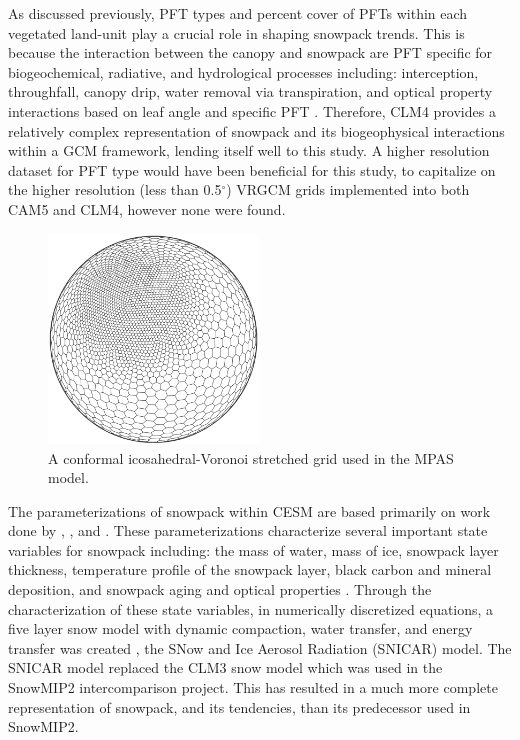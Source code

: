 \documentclass[11pt]{article}
\begin{document}
As discussed previously, PFT types and percent cover of PFTs within each vegetated land-unit play a crucial role in shaping snowpack trends. This is because the interaction between the canopy and snowpack are PFT specific for biogeochemical, radiative, and hydrological processes including: interception, throughfall, canopy drip, water removal via transpiration, and optical property interactions based on leaf angle and specific PFT \citep{lawrence2011parameterization}.  Therefore, CLM4 provides a relatively complex representation of snowpack and its biogeophysical interactions within a GCM framework, lending itself well to this study.   A higher resolution dataset for PFT type would have been beneficial for this study, to capitalize on the higher resolution (less than 0.5$^\circ$) VRGCM grids implemented into both CAM5 and CLM4, however none were found.

\begin{figure}
\centering\includegraphics[width=2.2in]{RinglerGrid.png}
\caption{A conformal icosahedral-Voronoi stretched grid used in the MPAS model.} \label{fig:MPAS-AdaptedGrid}
\end{figure}

The parameterizations of snowpack within CESM are based primarily on work done by \citet{anderson1976point}, \citet{jordan1991one}, and \citet{yongjiu1997land}. These parameterizations characterize several important state variables for snowpack including: the mass of water, mass of ice, snowpack layer thickness, temperature profile of the snowpack layer, black carbon and mineral deposition, and snowpack aging and optical properties \citep{lawrence2011parameterization}. Through the characterization of these state variables, in numerically discretized equations, a five layer snow model with dynamic compaction, water transfer, and energy transfer was created \citep{lawrence2011parameterization}, the SNow and Ice Aerosol Radiation (SNICAR) model.  The SNICAR model replaced the CLM3 snow model which was used in the SnowMIP2 intercomparison project.  This has resulted in a much more complete representation of snowpack, and its tendencies, than its predecessor used in SnowMIP2.
\end{document}
